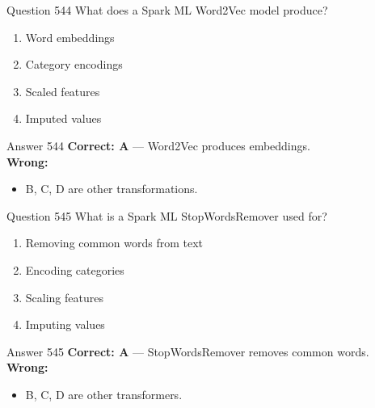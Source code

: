 \documentclass[aspectratio=169,11pt]{beamer}
\begin{document}
	\begin{frame}{Question 544}
		What does a Spark ML Word2Vec model produce?
		\begin{enumerate}[label=\Alph*.]
			\item Word embeddings
			\item Category encodings
			\item Scaled features
			\item Imputed values
		\end{enumerate}
	\end{frame}
	\begin{frame}{Answer 544}
		\textbf{Correct: A} --- Word2Vec produces embeddings.\\
		\vspace{0.5em}
		\textbf{Wrong:}
		\begin{itemize}
			\item B, C, D are other transformations.
		\end{itemize}
	\end{frame}
	
	\begin{frame}{Question 545}
		What is a Spark ML StopWordsRemover used for?
		\begin{enumerate}[label=\Alph*.]
			\item Removing common words from text
			\item Encoding categories
			\item Scaling features
			\item Imputing values
		\end{enumerate}
	\end{frame}
	\begin{frame}{Answer 545}
		\textbf{Correct: A} --- StopWordsRemover removes common words.\\
		\vspace{0.5em}
		\textbf{Wrong:}
		\begin{itemize}
			\item B, C, D are other transformers.
		\end{itemize}
	\end{frame}
	
\end{document}
